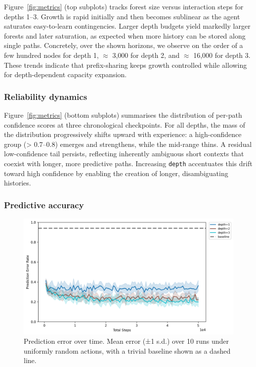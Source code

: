 \documentclass[11pt]{article}
\begin{document}
Figure~\ref{fig:metrics} (top subplots) tracks forest size versus interaction steps for depths 1–3. Growth is rapid initially and then becomes sublinear as the agent saturates easy-to-learn contingencies. Larger depth budgets yield markedly larger forests and later saturation, as expected when more history can be stored along single paths. Concretely, over the shown horizons, we observe on the order of a few hundred nodes for depth 1, $\approx$ 3,000 for depth 2, and $\approx$ 16,000 for depth 3. These trends indicate that prefix-sharing keeps growth controlled while allowing for depth-dependent capacity expansion.

\subsubsection{Reliability dynamics}

Figure~\ref{fig:metrics} (bottom subplots) summarises the distribution of per-path confidence scores at three chronological checkpoints. For all depths, the mass of the distribution progressively shifts upward with experience: a high-confidence group (> 0.7–0.8) emerges and strengthens, while the mid-range thins. A residual low-confidence tail persists, reflecting inherently ambiguous short contexts that coexist with longer, more predictive paths. Increasing \texttt{depth} accentuates this drift toward high confidence by enabling the creation of longer, disambiguating histories.

\subsubsection{Predictive accuracy}

\begin{figure}[ht]
\centering
\includegraphics[width=\linewidth]{img/error_rates.png}
\caption{Prediction error over time. Mean error (±1 s.d.) over 10 runs under uniformly random actions, with a trivial baseline shown as a dashed line.}
\label{fig:error_rates}
\end{figure}
\end{document}
